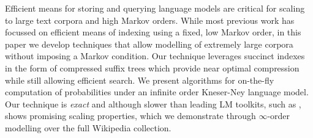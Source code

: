 Efficient means for storing and querying language models are critical for scaling  to large text corpora and high Markov orders.
While most previous work has focussed on efficient means of indexing \ngrams using a fixed, low Markov order,
in this paper we develop techniques that allow modelling of extremely large corpora without imposing a Markov condition.
Our technique leverages succinct indexes in the form of compressed suffix trees which provide near optimal compression while still allowing efficient search.
We present algorithms for on-the-fly computation of probabilities under an infinite order Kneser-Ney language model.
Our technique is \emph{exact} and although slower than leading LM toolkits, such as \SRILM, shows promising 
scaling properties, which we demonstrate through $\infty$-order modelling over the full Wikipedia collection. 

%
%
%
%
